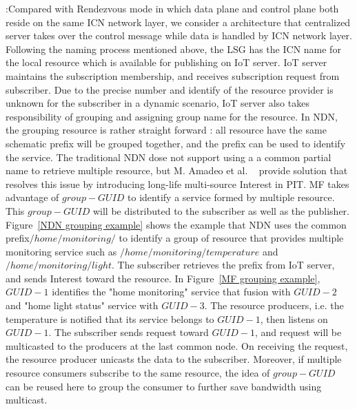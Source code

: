 \vspace{1mm}:Compared with Rendezvous mode in which data plane and control plane both reside on the same ICN network layer, we consider a architecture that centralized server takes over the control message while data is handled by ICN network layer. Following the naming process mentioned above, the LSG has the ICN name for the local resource which is available for publishing on IoT server. IoT server maintains the subscription membership, and receives subscription request from subscriber. Due to the precise number and identify of the resource provider is unknown for the subscriber in a dynamic scenario, IoT server also takes responsibility of grouping and assigning group name for the resource.
In NDN, the grouping resource is rather straight forward : all resource have the same schematic prefix will be grouped together, and the prefix can be used to identify the service. The traditional NDN dose not support using a a common partial name to retrieve multiple resource, but M. Amadeo et al. ~\cite{**Multi-source paper**} provide solution that resolves this issue by introducing long-life multi-source Interest in PIT.
MF takes advantage of  $group-GUID$ to identify a service formed by multiple resource. This $group-GUID$ will be distributed to the subscriber as well as the publisher. Figure~\ref{NDN grouping example} shows the example that NDN uses the common prefix$/home/monitoring/$ to identify a group of resource that provides multiple monitoring service such as $/home/monitoring/temperature$ and $/home/monitoring/light$. The subscriber retrieves the prefix from IoT server, and sends Interest toward the resource. In Figure~\ref{MF grouping example}, $GUID-1$ identifies the "home monitoring" service that fusion with $GUID-2$ and "home light status" service with $GUID-3$. The resource producers, i.e. the temperature is notified that its service belongs to $GUID-1$, then listens on $GUID-1$. The subscriber sends request toward  $GUID-1$, and request will be multicasted to the producers at the last common node. On receiving the request, the resource producer unicasts the data to the subscriber. Moreover, if multiple resource consumers subscribe to the same resource,
the idea of $group-GUID$ can be reused here to group the consumer to further save bandwidth using multicast.
\begin{figure}

\end{figure}
